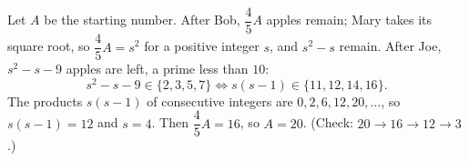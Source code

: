 Let $A$ be the starting number. After Bob, $\dfrac45A$ apples remain; Mary takes its square root, so $\dfrac45A=s^2$ for a positive integer $s$, and $s^2-s$ remain. After Joe, $s^2-s-9$ apples are left, a prime less than $10$:
\[s^2-s-9\in\{2,3,5,7\}\iff s(s-1)\in\{11,12,14,16\}.\]
The products $s(s-1)$ of consecutive integers are $0,2,6,12,20,\dots$, so $s(s-1)=12$ and $s=4$. Then $\dfrac45A=16$, so $A=\boxed{20}$. (Check: $20\to16\to12\to3$.)
